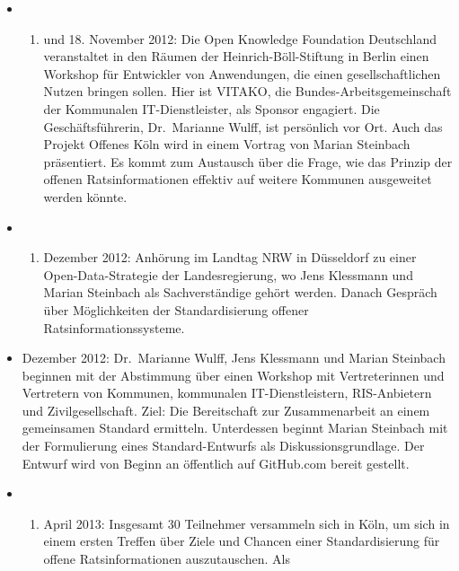 \documentclass[,a4paper]{article}
\begin{document}
\begin{itemize}
\item
  \begin{enumerate}
  \def\labelenumi{\arabic{enumi}.}
  \setcounter{enumi}{16}
  \itemsep1pt\parskip0pt
  \item
    und 18. November 2012: Die Open Knowledge Foundation Deutschland
    veranstaltet in den Räumen der Heinrich-Böll-Stiftung in Berlin
    einen Workshop für Entwickler von Anwendungen, die einen
    gesellschaftlichen Nutzen bringen sollen. Hier ist VITAKO, die
    Bundes-Arbeitsgemeinschaft der Kommunalen IT-Dienstleister, als
    Sponsor engagiert. Die Geschäftsführerin, Dr.~Marianne Wulff, ist
    persönlich vor Ort. Auch das Projekt Offenes Köln wird in einem
    Vortrag von Marian Steinbach präsentiert. Es kommt zum Austausch
    über die Frage, wie das Prinzip der offenen Ratsinformationen
    effektiv auf weitere Kommunen ausgeweitet werden könnte.
  \end{enumerate}
\item
  \begin{enumerate}
  \def\labelenumi{\arabic{enumi}.}
  \setcounter{enumi}{5}
  \itemsep1pt\parskip0pt
  \item
    Dezember 2012: Anhörung im Landtag NRW in Düsseldorf zu einer
    Open-Data-Strategie der Landesregierung, wo Jens Klessmann und
    Marian Steinbach als Sachverständige gehört werden. Danach Gespräch
    über Möglichkeiten der Standardisierung offener
    Ratsinformationssysteme.
  \end{enumerate}
\item
  Dezember 2012: Dr.~Marianne Wulff, Jens Klessmann und Marian Steinbach
  beginnen mit der Abstimmung über einen Workshop mit Vertreterinnen und
  Vertretern von Kommunen, kommunalen IT-Dienstleistern, RIS-Anbietern
  und Zivilgesellschaft. Ziel: Die Bereitschaft zur Zusammenarbeit an
  einem gemeinsamen Standard ermitteln. Unterdessen beginnt Marian
  Steinbach mit der Formulierung eines Standard-Entwurfs als
  Diskussionsgrundlage. Der Entwurf wird von Beginn an öffentlich auf
  GitHub.com bereit gestellt.
\item
  \begin{enumerate}
  \def\labelenumi{\arabic{enumi}.}
  \setcounter{enumi}{16}
  \itemsep1pt\parskip0pt
  \item
    April 2013: Insgesamt 30 Teilnehmer versammeln sich in Köln, um sich
    in einem ersten Treffen über Ziele und Chancen einer
    Standardisierung für offene Ratsinformationen auszutauschen. Als

\end{enumerate}
\end{itemize}
\end{document}
